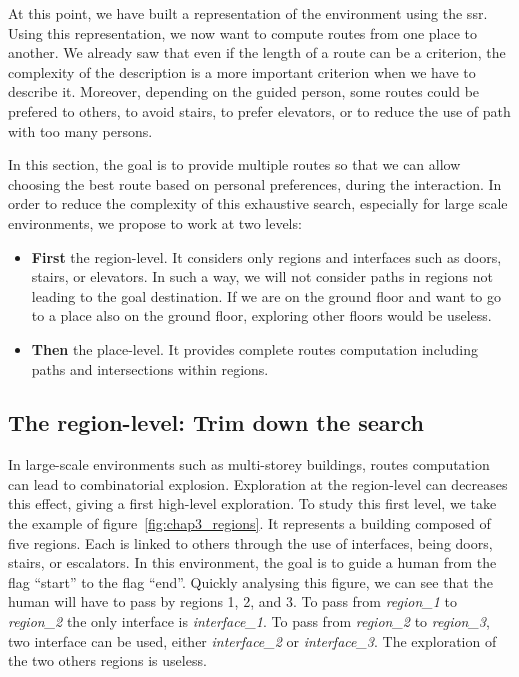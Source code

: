 At this point, we have built a representation of the environment using the \acrfull{ssr}. Using this representation, we now want to compute routes from one place to another. We already saw that even if the length of a route can be a criterion, the complexity of the description is a more important criterion when we have to describe it. Moreover, depending on the guided person, some routes could be prefered to others, to avoid stairs, to prefer elevators, or to reduce the use of path with too many persons.

In this section, the goal is to provide multiple routes so that we can allow choosing the best route based on personal preferences, during the interaction. In order to reduce the complexity of this exhaustive search, especially for large scale environments, we propose to work at two levels:
\begin{itemize}
\item \textbf{First} the region-level. It considers only regions and interfaces such as doors, stairs, or elevators. In such a way, we will not consider paths in regions not leading to the goal destination. If we are on the ground floor and want to go to a place also on the ground floor, exploring other floors would be useless.
\item \textbf{Then} the place-level. It provides complete routes computation including paths and intersections within regions.
\end{itemize}

\subsection{The region-level: Trim down the search}

In large-scale environments such as multi-storey buildings, routes computation can lead to combinatorial explosion. Exploration at the region-level can decreases this effect, giving a first high-level exploration. To study this first level, we take the example of figure~\ref{fig:chap3_regions}. It represents a building composed of five regions. Each is linked to others through the use of interfaces, being doors, stairs, or escalators. In this environment, the goal is to guide a human from the flag ``start'' to the flag ``end''. Quickly analysing this figure, we can see that the human will have to pass by regions 1, 2, and 3. To pass from \textit{region\_1} to \textit{region\_2} the only interface is \textit{interface\_1}. To pass from \textit{region\_2} to \textit{region\_3}, two interface can be used, either \textit{interface\_2} or \textit{interface\_3}. The exploration of the two others regions is useless.

